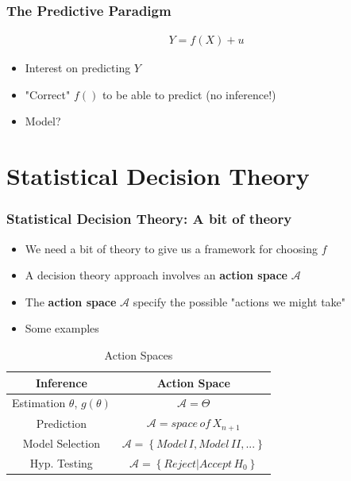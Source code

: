 \documentclass[
  shownotes,
  xcolor={svgnames},
  hyperref={colorlinks,citecolor=DarkBlue,linkcolor=DarkRed,urlcolor=DarkBlue}
  ]{beamer}
\begin{document}

\begin{frame}
\frametitle{The Predictive Paradigm}


\begin{align}
Y=f(X)+u
\end{align}

\begin{itemize}
  \item Interest on predicting $Y$
  \medskip
  \item "Correct" $f()$ to be able to predict (no inference!)
  \medskip
  \item Model?

\end{itemize}


\end{frame}


\section{Statistical Decision Theory}
\begin{frame}
\frametitle{Statistical Decision Theory: A bit of theory}

\begin{itemize}
  \item We need a bit of theory to give us a framework for choosing $f$
  \item A decision theory approach involves an {\bf action space} $\mathcal{A}$
  \item The {\bf action space} $\mathcal{A}$ specify the possible "actions we might take"
  \item Some examples
\end{itemize}

\footnotesize

\begin{table}[H]
\caption{Action Spaces}

\begin{centering}
\begin{tabular}{cc}
\hline
Inference & Action Space\\
\hline
\hline
Estimation $\theta$, $g\left(\theta\right)$  & $\mathcal{A}=\Theta$\\
Prediction & $\mathcal{A}=space\,of\,X_{n+1}$\\
Model Selection & $\mathcal{A}=\left\{ Model\,I,Model\,II,...\right\} $\\
Hyp. Testing & $\mathcal{A}=\left\{ Reject|Accept\,H_{0}\right\} $\\

\hline
\end{tabular}
\par\end{centering}
\end{table}


\end{frame}
\end{document}
